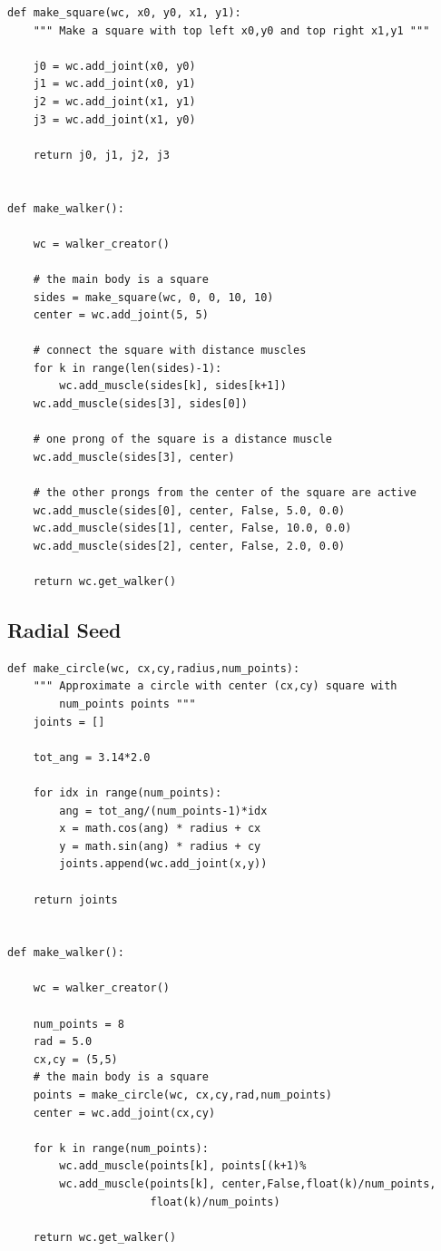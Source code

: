 \documentclass{article}
\begin{document}
\begin{verbatim}
def make_square(wc, x0, y0, x1, y1):
    """ Make a square with top left x0,y0 and top right x1,y1 """

    j0 = wc.add_joint(x0, y0)
    j1 = wc.add_joint(x0, y1)
    j2 = wc.add_joint(x1, y1)
    j3 = wc.add_joint(x1, y0)

    return j0, j1, j2, j3


def make_walker():

    wc = walker_creator()

    # the main body is a square
    sides = make_square(wc, 0, 0, 10, 10)
    center = wc.add_joint(5, 5)

    # connect the square with distance muscles
    for k in range(len(sides)-1):
        wc.add_muscle(sides[k], sides[k+1])
    wc.add_muscle(sides[3], sides[0])

    # one prong of the square is a distance muscle
    wc.add_muscle(sides[3], center)

    # the other prongs from the center of the square are active
    wc.add_muscle(sides[0], center, False, 5.0, 0.0)
    wc.add_muscle(sides[1], center, False, 10.0, 0.0)
    wc.add_muscle(sides[2], center, False, 2.0, 0.0)

    return wc.get_walker()
\end{verbatim}

\subsection{Radial Seed}
\label{source:radial}

\begin{verbatim}
def make_circle(wc, cx,cy,radius,num_points):
    """ Approximate a circle with center (cx,cy) square with 
        num_points points """
    joints = []

    tot_ang = 3.14*2.0

    for idx in range(num_points):
        ang = tot_ang/(num_points-1)*idx
        x = math.cos(ang) * radius + cx
        y = math.sin(ang) * radius + cy
        joints.append(wc.add_joint(x,y))

    return joints


def make_walker():

    wc = walker_creator()

    num_points = 8
    rad = 5.0
    cx,cy = (5,5)
    # the main body is a square
    points = make_circle(wc, cx,cy,rad,num_points)
    center = wc.add_joint(cx,cy)

    for k in range(num_points):
        wc.add_muscle(points[k], points[(k+1)%
        wc.add_muscle(points[k], center,False,float(k)/num_points,
                      float(k)/num_points)

    return wc.get_walker()
\end{verbatim}
\end{document}
